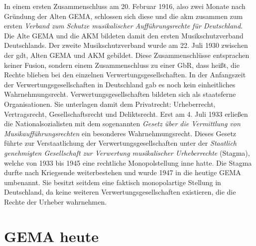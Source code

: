 \newline
In einem ersten Zusammenschluss am 20. Februar 1916, also zwei Monate nach Gründung der Alten GEMA, schlossen sich diese und die \gls{akm} zusammen zum ersten \textit{Verband zum Schutze musikalischer Aufführungsrechte für Deutschland}. Die Alte GEMA und die AKM bildeten damit den ersten Musikschutzverband Deutschlands. 
\newline
Der zweite Musikschutzverband wurde am 22. Juli 1930 zwischen der \gls{gdt}, Alten GEMA und AKM gebildet.
Diese Zusammenschlüsse entsprachen keiner Fusion, sondern einem Zusammenschluss zu einer GbR, dass heißt, die Rechte blieben bei den einzelnen Verwertungsgesellschaften.
\newline
\newline
In der Anfangszeit der Verwertungsgesellschaften in Deutschland gab es noch kein einheitliches Wahrnehmungsrecht. \glqq Verwertungsgesellschaften bildeten sich als staatsferne Organisationen.\grqq{} Sie unterlagen damit dem Privatrecht: Urheberrecht, Vertragsrecht, Gesellschaftsrecht und Deliktsrecht.
\newline
Erst am 4. Juli 1933 erließen die Nationalsozialisten mit dem sogenannten \textit{Gesetz über die Vermittlung von Musikaufführungsrechten} ein besonderes Wahrnehmungsrecht. Dieses Gesetz führte zur Verstaatlichung der Verwertungsgesellschaften unter der \textit{Staatlich genehmigten Gesellschaft zur Verwertung musikalischer Urheberrechte} (Stagma), welche von 1933 bis 1945 eine rechtliche Monopolstellung inne hatte.
\newline
Die Stagma durfte nach Kriegsende weiterbestehen und wurde 1947 in die heutige GEMA umbenannt. Sie besitzt seitdem eine faktisch monopolartige Stellung in Deutschland, da keine weiteren Verwertungsgesellschaften existieren, die die Rechte der Urheber wahrnehmen.
\section{GEMA heute}


